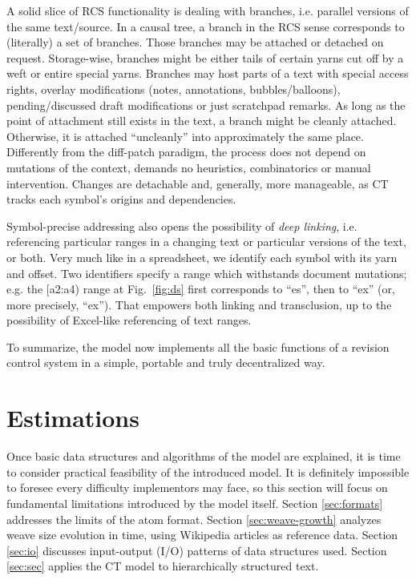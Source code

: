 \documentclass{sig-alternate}
\begin{document}

A solid slice of RCS functionality is dealing with branches, i.e. parallel versions of the same text/source.
In a causal tree, a branch in the RCS sense corresponds to (literally) a set of branches.
Those branches may be attached or detached on request.
Storage-wise, branches might be either tails of certain yarns cut off by a weft or entire special yarns.
Branches may host parts of a text with special access rights, overlay modifications (notes, annotations, bubbles/balloons), pending/discussed draft modifications or just scratchpad remarks.
As long as the point of attachment still exists in the text, a branch might be cleanly attached.
Otherwise, it is attached ``uncleanly'' into approximately the same place.
Differently from the diff-patch paradigm, the process does not depend on mutations of the context, demands no heuristics, combinatorics or manual intervention. Changes are detachable and, generally, more manageable, as CT tracks each symbol's origins and dependencies.

Symbol-precise addressing also opens the possibility of \emph{deep linking}, i.e. referencing particular ranges in a changing text or particular versions of the text, or both.
Very much like in a spreadsheet, we identify each symbol with its yarn and offset. Two identifiers specify a range which withstands document mutations; e.g. the [a2:a4) range at Fig.~\ref{fig:ds} first corresponds to ``es'', then to ``ex'' (or, more precisely, ``ex\bsp'').
That empowers both linking and transclusion, up to the possibility of Excel-like referencing of text ranges.

To summarize, the model now implements all the basic functions of a revision control system in a simple, portable and truly decentralized way.

\section{Estimations} \label{sec:estim}

Once basic data structures and algorithms of the model are explained,
it is time to consider practical feasibility of the introduced model.
It is definitely impossible to foresee every difficulty implementors may face, so this section will focus on fundamental limitations introduced by the model itself.
Section \ref{sec:formats} addresses the limits of the atom format.
Section \ref{sec:weave-growth} analyzes weave size evolution in time, using Wikipedia articles as reference data.
Section \ref{sec:io} discusses input-output (I/O) patterns of data structures used.
Section \ref{sec:sec} applies the CT model to hierarchically structured text.
\end{document}
